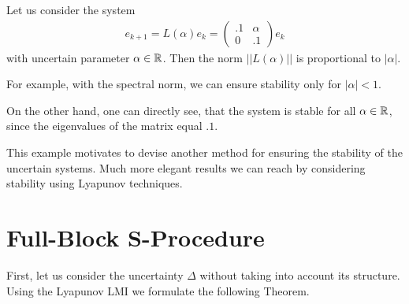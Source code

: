 \begin{exam}
	\label{exp:rob:bad_example}
Let us consider the system 
\begin{align}
e_{k+1}  = L(\alpha) e_k = \begin{pmatrix}
.1 & \alpha \\ 0 & .1
\end{pmatrix}e_k
\end{align}
with uncertain parameter $\alpha \in {\mathbb{R}}$.
Then the norm $||L(\alpha)||$ is proportional to $|\alpha|$.

For example, with the spectral norm, we can ensure stability only for $|\alpha|<1$. 


On the other hand, one can directly see, that the system is stable for all $\alpha \in {\mathbb{R}}$, since the eigenvalues of the matrix equal $.1$. 	
\end{exam}

This example motivates to devise another method for ensuring the stability of the uncertain systems. 
Much more elegant results we can reach by considering stability using Lyapunov techniques. 

 

\section{Full-Block S-Procedure}

First, let us consider the uncertainty $\Delta$ without taking into account its structure. 
Using the Lyapunov LMI we formulate the following Theorem. 

